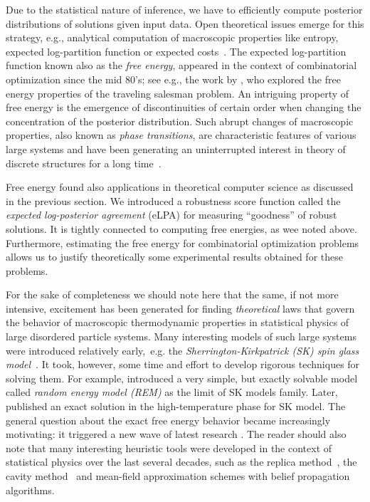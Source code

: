 Due to the statistical nature of inference, we have to efficiently compute
posterior distributions of solutions given input data. Open theoretical issues
emerge for this strategy, e.g., analytical computation of macroscopic properties
like entropy, expected log-partition function or expected
costs~\citep{moor85qap,talagrand03}. The expected log-partition function known
also as the \textit{free energy}, appeared in the context of combinatorial
optimization since the mid 80's; see e.g., the work by \citet{mezard84tsp}, who
explored the free energy properties of the traveling salesman problem.  An
intriguing property of free energy is the emergence of discontinuities of
certain order when changing the concentration of the posterior distribution.
Such abrupt changes of macroscopic properties, also known as \textit{phase
transitions}, are characteristic features of various large systems and have been
generating an uninterrupted interest in theory of discrete structures for a long
time~\citep[see][]{cohen88, LUCZAK1994}.

Free energy found also applications in theoretical computer science as discussed
in the previous section. We introduced a robustness score function called the
\textit{expected log-posterior agreement} (eLPA) for measuring ``goodness'' of
robust solutions. It is tightly connected to computing free energies, as wee
noted above. Furthermore, estimating the free energy for combinatorial
optimization problems allows us to justify theoretically some experimental
results obtained for these problems.

For the sake of completeness we should note here that the same, if not more
intensive, excitement has been generated for finding \textit{theoretical} laws
that govern the behavior of macroscopic thermodynamic properties in statistical
physics of large disordered particle systems.  Many interesting models of such
large systems were introduced relatively early,~e.g. the
\textit{Sherrington-Kirkpatrick (SK) spin glass model}~\citep[see][]{sk75spin}.
It took, however, some time and effort to develop rigorous techniques for
solving them. For example, \citet{derrida81} introduced a very simple, but
exactly solvable model called \textit{random energy model (REM)} as the limit of
SK models family. Later, \citet{Aizenman1987} published an exact solution in the
high-temperature phase for SK model. The general question about the exact free
energy behavior became increasingly motivating: it triggered a new wave of
latest research \citep[see][]{Bovier2002FreeEnergyFluct, talagrand03}. The
reader should also note that many interesting heuristic tools were developed in
the context of statistical physics over the last several decades, such as the
replica method~\citep{Parisi2009replica}, the cavity
method~\citep{Mezard2003Cavity} and mean-field approximation schemes with belief
propagation algorithms.

